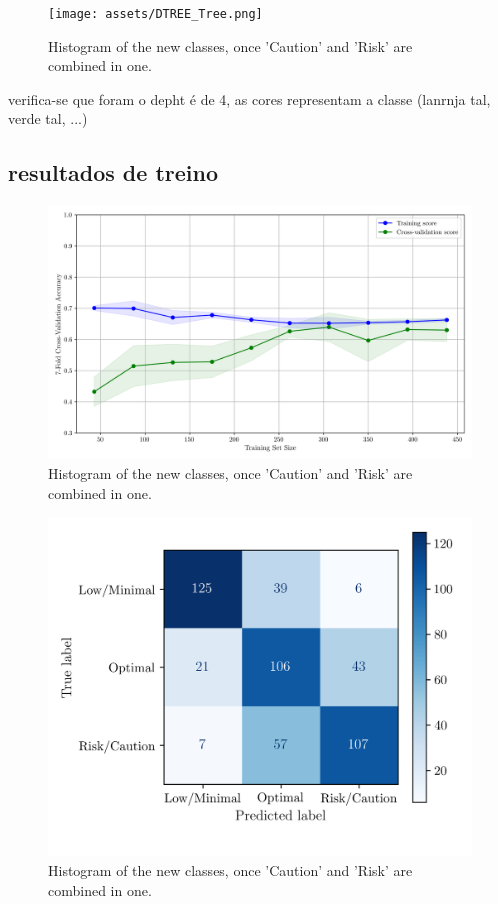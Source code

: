 \documentclass[conference]{IEEEtran}
\begin{document}
\begin{figure}[H]
    \centering
    \texttt{[image: assets/DTREE\_Tree.png]}
    \caption{Histogram of the new classes, once 'Caution' and 'Risk' are combined in one.}
    \label{dtree_tree}
\end{figure}

verifica-se que foram o depht é de 4, as cores representam a classe (lanrnja tal, verde tal, ...)

\subsection{resultados de treino}

\begin{figure}[H]
    \centering
    \includegraphics[width=1\linewidth]{assets/DTREE_LearningCurve.png}
    \caption{Histogram of the new classes, once 'Caution' and 'Risk' are combined in one.}
    \label{dtree_lcurve}
\end{figure}

\begin{figure}[H]
    \centering
    \includegraphics[width=1\linewidth]{assets/DTREE_ConfusionMatrixTrain.png}
    \caption{Histogram of the new classes, once 'Caution' and 'Risk' are combined in one.}
    \label{dtree_cmtrain}
\end{figure}
\end{document}
